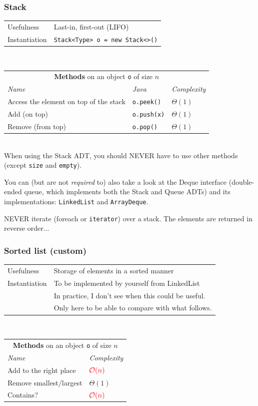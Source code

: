 \documentclass[8pt,aspectratio=169]{beamer}
\begin{document}
\begin{frame}
\frametitle{Stack}
\centering
\begin{tabular}{ll}
	Usefulness & Last-in, first-out (LIFO)\\
	Instantiation & \texttt{Stack<Type> o = new Stack<>()}
\end{tabular}\\
\vspace{0.5cm}
\centering
\begin{tabular}{lll}
	\multicolumn{3}{c}{\textbf{Methods} on an object \texttt{o} of size $n$} \\
	\textit{Name} & \textit{Java} & \textit{Complexity} \\
	Access the element on top of the stack & \texttt{o.peek()} & $\Theta(1)$\\
	Add (on top) & \texttt{o.push(x)} & $\Theta(1)$\\
	Remove (from top) & \texttt{o.pop()} & $\Theta(1)$\\
\end{tabular}\\
\vspace{0.5cm}
\color{blue} When using the Stack ADT, you should NEVER have to use other methods (except \texttt{size} and \texttt{empty}).

\color{blue} You can (but are not \textit{required} to) also take a look at the Deque interface (double-ended queue, which implements both the Stack and Queue ADTs) and its implementations: \texttt{LinkedList} and \texttt{ArrayDeque}.

\color{red} NEVER iterate (foreach or \texttt{iterator}) over a stack. The elements are returned in reverse order...

\end{frame}

\begin{frame}
\frametitle{Sorted list (custom)}
\centering
\begin{tabular}{ll}
	Usefulness & Storage of elements in a sorted manner\\
	Instantiation & To be implemented by yourself from LinkedList\\
	& \color{red} In practice, I don't see when this could be useful. \\
	& \color{red} Only here to be able to compare with what follows.
	
\end{tabular}\\
\vspace{0.5cm}
\centering
\begin{tabular}{ll}
	\multicolumn{2}{c}{\textbf{Methods} on an object \texttt{o} of size $n$} \\
	\textit{Name} & \textit{Complexity} \\
	Add to the right place & $\color{red}\mathcal{O}(n)$\\
    Remove smallest/largest & $\Theta(1)$\\
    Contains? & $\color{red}\mathcal{O}(n)$\\
\end{tabular}\\
\vspace{0.5cm}
\end{frame}
\end{document}
